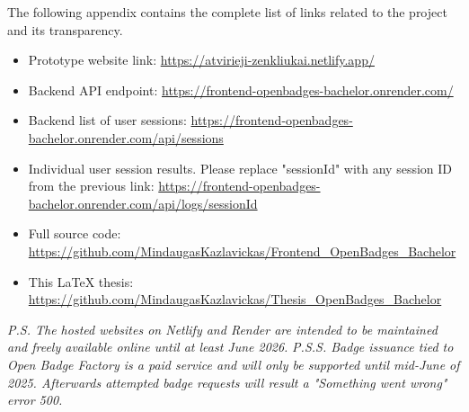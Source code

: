 \newpage
{}
\label{appendix:external_resources}

The following appendix contains the complete list of links related to the project and its transparency.

\vspace{0.5em}
\begin{itemize}
  \item Prototype website link: \url{https://atvirieji-zenkliukai.netlify.app/}
  \item Backend API endpoint: \url{https://frontend-openbadges-bachelor.onrender.com/}
  \item Backend list of user sessions: \url{https://frontend-openbadges-bachelor.onrender.com/api/sessions}
  \item Individual user session results. Please replace "sessionId" with any session ID from the previous link: \url{https://frontend-openbadges-bachelor.onrender.com/api/logs/sessionId}
  \item Full source code: \url{https://github.com/MindaugasKazlavickas/Frontend_OpenBadges_Bachelor}
  \item This LaTeX thesis: \url{https://github.com/MindaugasKazlavickas/Thesis_OpenBadges_Bachelor}
\end{itemize}

\textit{P.S. The hosted websites on Netlify and Render are intended to be maintained and freely available online until at least June 2026.}
\textit{P.S.S. Badge issuance tied to Open Badge Factory is a paid service and will only be supported until mid-June of 2025. Afterwards attempted badge requests will result a "Something went wrong" error 500.}